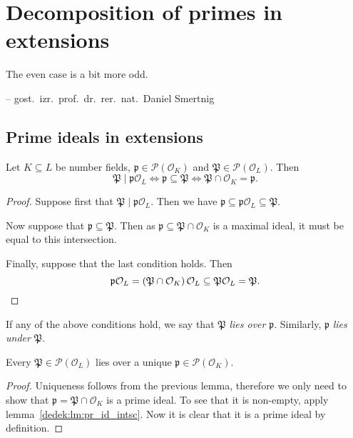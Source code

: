 \section{Decomposition of primes in extensions}

\epigraph{The even case is a bit more odd.}
{-- gost.~izr.~prof.~dr.~rer.~nat.~Daniel Smertnig}

\subsection{Prime ideals in extensions}


\begin{lema}
Let $K \subseteq L$ be number fields,
$\mathfrak{p} \in \mathcal{P}(\mathcal{O}_K)$ and
$\mathfrak{P} \in \mathcal{P}(\mathcal{O}_L)$. Then
\[
\mathfrak{P} \mid \mathfrak{p} \mathcal{O}_L \iff
\mathfrak{p} \subseteq \mathfrak{P} \iff
\mathfrak{P} \cap \mathcal{O}_K = \mathfrak{p}.
\]
\end{lema}

\begin{proof}
Suppose first that $\mathfrak{P} \mid \mathfrak{p} \mathcal{O}_L$.
Then we have
$\mathfrak{p} \subseteq
\mathfrak{p} \mathcal{O}_L \subseteq
\mathfrak{P}$.

Now suppose that $\mathfrak{p} \subseteq \mathfrak{P}$. Then as
$\mathfrak{p} \subseteq \mathfrak{P} \cap \mathcal{O}_K$ is a
maximal ideal, it must be equal to this intersection.

Finally, suppose that the last condition holds. Then
\[
\mathfrak{p} \mathcal{O}_L =
\left(\mathfrak{P} \cap \mathcal{O}_K\right) \mathcal{O}_L \subseteq
\mathfrak{P} \mathcal{O}_L =
\mathfrak{P}. \qedhere
\]
\end{proof}

\begin{definicija}
If any of the above conditions hold, we say that
$\mathfrak{P}$ \emph{lies over}
$\mathfrak{p}$. Similarly, $\mathfrak{p}$ \emph{lies under}
$\mathfrak{P}$.
\end{definicija}

\begin{lema}
Every $\mathfrak{P} \in \mathcal{P}(\mathcal{O}_L)$ lies over a
unique $\mathfrak{p} \in \mathcal{P}(\mathcal{O}_K)$.
\end{lema}

\begin{proof}
Uniqueness follows from the previous lemma, therefore we only need
to show that $\mathfrak{p} = \mathfrak{P} \cap \mathcal{O}_K$ is a
prime ideal. To see that it is non-empty, apply
lemma~\ref{dedek:lm:pr_id_intsc}. Now it is clear that it is a
prime ideal by definition.
\end{proof}

